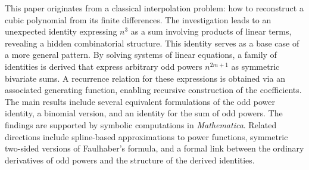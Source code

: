 This paper originates from a classical interpolation problem: how to reconstruct a cubic polynomial
from its finite differences.
The investigation leads to an unexpected identity expressing $n^3$ as a sum involving products of linear terms,
revealing a hidden combinatorial structure.
This identity serves as a base case of a more general pattern.
By solving systems of linear equations, a family of identities is derived that express
arbitrary odd powers $n^{2m+1}$ as symmetric bivariate sums.
A recurrence relation for these expressions is obtained via an associated generating function,
enabling recursive construction of the coefficients.
The main results include several equivalent formulations of the odd power identity,
a binomial version, and an identity for the sum of odd powers.
The findings are supported by symbolic computations in \textit{Mathematica}.
Related directions include spline-based approximations to power functions,
symmetric two-sided versions of Faulhaber's formula, and a formal link between
the ordinary derivatives of odd powers and the structure of the derived identities.
